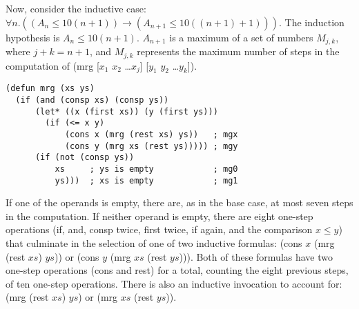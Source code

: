 Now, consider the inductive case:
$\forall n.((A_n \leq 10(n+1)) \rightarrow (A_{n+1} \leq 10((n+1) + 1)))$.
The induction hypothesis is $A_n \leq 10(n + 1)$.
$A_{n+1}$ is a maximum of a set of numbers $M_{j,k}$, where $j + k = n+1$,
and $M_{j,k}$ represents the maximum number of steps in the computation of
\textsf{(mrg [$x_1$ $x_2$ \dots $x_j$] [$y_1$ $y_2$ \dots $y_k$])}.

\label{defun:mrg-copy}
\begin{Verbatim}
(defun mrg (xs ys)
  (if (and (consp xs) (consp ys))
      (let* ((x (first xs)) (y (first ys)))
        (if (<= x y)
            (cons x (mrg (rest xs) ys))   ; mgx
            (cons y (mrg xs (rest ys))))) ; mgy
      (if (not (consp ys))
          xs     ; ys is empty            ; mg0
          ys)))  ; xs is empty            ; mg1
\end{Verbatim}

If one of the operands is empty, there are, as in the base case,
at most seven steps in the computation.
If neither operand is empty, there are eight one-step operations
(\textsf{if}, \textsf{and}, \textsf{consp} twice,
\textsf{first} twice, \textsf{if} again, and the comparison $x \leq y$)
that culminate in the selection of
one of two inductive formulas: \textsf{(cons $x$ (mrg (rest $xs$) $ys$))}
or \textsf{(cons $y$ (mrg $xs$ (rest $ys$)))}.
Both of these formulas have two one-step operations (\textsf{cons} and \textsf{rest})
for a total, counting the eight previous steps, of ten one-step operations.
There is also an inductive invocation to account for:
\textsf{(mrg (rest $xs$) $ys$) or (mrg $xs$ (rest $ys$))}.


